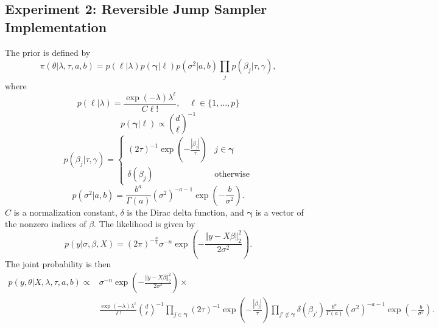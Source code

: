 \subsection{Experiment 2: Reversible Jump Sampler Implementation}
\label{appendix:ex2}
The prior is defined by
\begin{equation}
  \pi(\theta|\lambda, \tau, a, b ) = p(\ell|\lambda) p(\mathbf{\gamma}|\ell) p(\sigma^{2} | a, b) \prod_{j} p(\beta_{j} | \tau, \gamma),
\end{equation}
where
\begin{equation}
  p(\ell|\lambda) = \frac{\exp{(-\lambda)} \lambda^{\ell}}{C\ell!}, \quad \ell \in \{1,\ldots, p\}
\end{equation}
\begin{equation}
  p(\mathbf{\gamma}|\ell) \propto {d\choose \ell}^{-1}
\end{equation}
\begin{equation}
  p(\beta_{j} | \tau, \gamma ) = \begin{cases} (2\tau)^{-1}\exp(-\frac{|\beta_{j}|}{\tau}) & j \in \mathbf{\gamma} \\ \delta(\beta_{j}) & \text{otherwise} \end{cases}
\end{equation}
\begin{equation}
    p(\sigma^{2} | a, b) = \frac{b^{a}}{\Gamma(a)} (\sigma^{2})^{-a-1} \exp{\left(-\frac{b}{\sigma^{2}}\right)}.
\end{equation}
$C$ is a normalization constant, $\delta$ is the Dirac delta function, and $\mathbf{\gamma}$ is a vector of the nonzero indices of $\beta$.
The likelihood is given by
\begin{equation}
  p(y | \sigma, \beta, X ) = (2\pi)^{-\frac{n}{2}} \sigma^{-n} \exp{\left(-\frac{\Vert y-X\beta\Vert^{2}_{2}}{2\sigma^{2}}\right)}.
\end{equation}
The joint probability is then
\begin{equation}
    \begin{aligned}
         p(y, \theta | X, \lambda, \tau, a, b ) \propto &\sigma^{-n} \exp{\left(-\frac{\Vert  y-X\beta\Vert^{2}_{2}}{2\sigma^{2}}\right)} \times \\ 
         & \frac{\exp{(-\lambda)} \lambda^{\ell}}{\ell!} {d\choose \ell}^{-1} \prod_{j\in \mathbf{\gamma}} (2\tau)^{-1}\exp\left(-\frac{|\beta_{j}|}{\tau}\right) \prod_{j' \notin \mathbf{\gamma}} \delta(\beta_{j'}) \frac{b^{a}}{\Gamma(a)} (\sigma^{2})^{-a-1} \exp{\left(-\frac{b}{\sigma^{2}}\right)}.
    \end{aligned}
    \label{eq:ex2_joint}
\end{equation}

